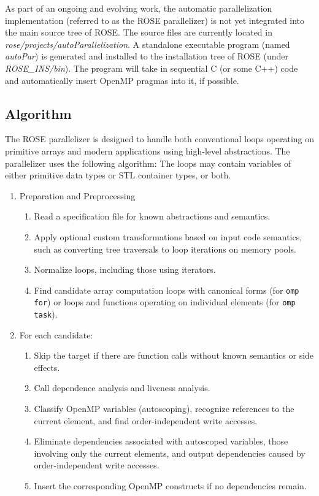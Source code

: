 As part of an ongoing and evolving work, the automatic parallelization
implementation (referred to as the ROSE parallelizer) is not yet integrated into the main
source tree of ROSE. 
The source files are currently located in
\textit{rose/projects/autoParallelization}.
A standalone executable program (named \textit{autoPar}) is generated and
installed to the installation tree of ROSE (under \textit{ROSE\_INS/bin}). 
The program will take in sequential C (or some C++) code and automatically
insert OpenMP pragmas into it, if possible. 
\subsection{Algorithm}
The ROSE parallelizer is designed to handle both conventional loops operating on primitive
arrays and modern applications using high-level abstractions.
The parallelizer uses the following algorithm:
The loops may contain variables of either primitive data types
or STL container types, or both. 
\begin{enumerate}
  \item Preparation and Preprocessing
  \begin{enumerate}
  \item  Read a specification file for known abstractions and semantics. %
  \item  Apply optional custom transformations based on input code semantics,
  such as converting tree traversals to loop iterations on memory
  pools.
  \item  Normalize loops, including those using iterators.
  \item  Find candidate array computation loops
  with canonical forms (for \lstinline{omp for}) or loops and functions
  operating on individual elements (for \lstinline{omp task}).
  \end{enumerate}
  \item  For each candidate:
  \begin{enumerate}
    \item Skip the target if there are function calls without known semantics or side effects. %
    \item Call dependence analysis and liveness analysis.
    \item Classify OpenMP variables (autoscoping), recognize references
    to the current element, and find order-independent write accesses.
    \item Eliminate dependencies associated with autoscoped variables,
    those involving only the current elements, and output dependencies
    caused by order-independent write accesses.
    \item Insert the corresponding OpenMP constructs if no dependencies
    remain.
  \end{enumerate}
\end{enumerate}
